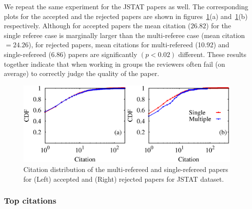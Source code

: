 We repeat the same experiment for the JSTAT papers as well. The corresponding plots for the accepted and the rejected papers are shown in 
figures~\ref{citation:jstat}(a) and~\ref{citation:jstat}(b) respectively. Although for accepted papers the mean citation ($26.82$) for the single referee 
case is marginally larger than the 
multi-referee case (mean citation $= 24.26$), for rejected papers,    
mean citations for multi-refereed (10.92) and single-refereed (6.86) papers are significantly $(p < 0.02)$ different.
These results together 
indicate that when working in groups the reviewers often fail (on average) to correctly judge the quality of the paper.




\begin{figure}
 \centering
 \includegraphics[scale = 0.35]{./texfiles/Chapter_4/cikm_17/figures/citation_jstat_1.eps}
 \caption{\label{citation:jstat} Citation distribution of the multi-refereed and single-refereed papers for (Left) accepted and (Right) rejected papers for JSTAT dataset.}
 \vspace{3mm}
 \end{figure}





\subsubsection{Top citations}

